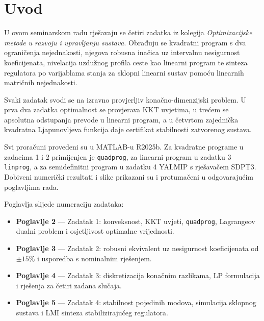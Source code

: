 \section{Uvod}

U ovom seminarskom radu rješavaju se četiri zadatka iz kolegija \textit{Optimizacijske metode u razvoju i upravljanju sustava}. Obrađuju se kvadratni program s dva ograničenja nejednakosti, njegova robusna inačica uz intervalnu nesigurnost koeficijenata, nivelacija uzdužnog profila ceste kao linearni program te sinteza regulatora po varijablama stanja za sklopni linearni sustav pomoću linearnih matričnih nejednakosti.

Svaki zadatak svodi se na izravno provjerljiv konačno-dimenzijski problem. U prva dva zadatka optimalnost se provjerava KKT uvjetima, u trećem se apsolutna odstupanja prevode u linearni program, a u četvrtom zajednička kvadratna Ljapunovljeva funkcija daje certifikat stabilnosti zatvorenog sustava.

Svi proračuni provedeni su u MATLAB-u R2025b. Za kvadratne programe u zadacima 1 i 2 primijenjen je \texttt{quadprog}, za linearni program u zadatku 3 \texttt{linprog}, a za semidefinitni program u zadatku 4 YALMIP s rješavačem SDPT3. Dobiveni numerički rezultati i slike prikazani su i protumačeni u odgovarajućim poglavljima rada.

Poglavlja slijede numeraciju zadataka:
\begin{itemize}
    \item \textbf{Poglavlje 2} --- Zadatak 1: konveksnost, KKT uvjeti, \texttt{quadprog}, Lagrangeov dualni problem i osjetljivost optimalne vrijednosti.
    \item \textbf{Poglavlje 3} --- Zadatak 2: robusni ekvivalent uz nesigurnost koeficijenata od $\pm 15\%$ i usporedba s nominalnim rješenjem.
    \item \textbf{Poglavlje 4} --- Zadatak 3: diskretizacija konačnim razlikama, LP formulacija i rješenja za četiri zadana slučaja.
    \item \textbf{Poglavlje 5} --- Zadatak 4: stabilnost pojedinih modova, simulacija sklopnog sustava i LMI sinteza stabilizirajućeg regulatora.
\end{itemize}
